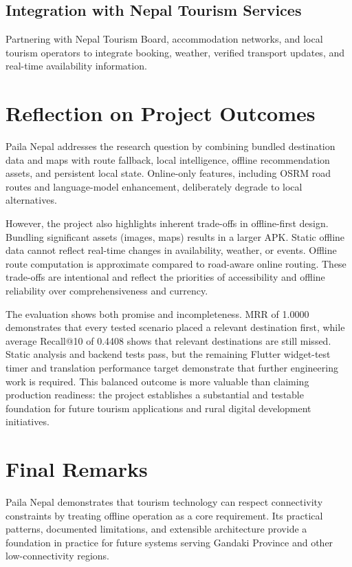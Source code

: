 \documentclass[12pt,a4paper,oneside]{report}
\begin{document}
\subsection{Integration with Nepal Tourism Services}

Partnering with Nepal Tourism Board, accommodation networks, and local tourism operators to integrate booking, weather, verified transport updates, and real-time availability information.

\section{Reflection on Project Outcomes}
\label{sec:reflection}

Paila Nepal addresses the research question by combining bundled destination data and maps with route fallback, local intelligence, offline recommendation assets, and persistent local state. Online-only features, including OSRM road routes and language-model enhancement, deliberately degrade to local alternatives.

However, the project also highlights inherent trade-offs in offline-first design. Bundling significant assets (images, maps) results in a larger APK. Static offline data cannot reflect real-time changes in availability, weather, or events. Offline route computation is approximate compared to road-aware online routing. These trade-offs are intentional and reflect the priorities of accessibility and offline reliability over comprehensiveness and currency.

The evaluation shows both promise and incompleteness. MRR of 1.0000 demonstrates that every tested scenario placed a relevant destination first, while average Recall@10 of 0.4408 shows that relevant destinations are still missed. Static analysis and backend tests pass, but the remaining Flutter widget-test timer and translation performance target demonstrate that further engineering work is required. This balanced outcome is more valuable than claiming production readiness: the project establishes a substantial and testable foundation for future tourism applications and rural digital development initiatives.

\section{Final Remarks}
\label{sec:final}

Paila Nepal demonstrates that tourism technology can respect connectivity constraints by treating offline operation as a core requirement. Its practical patterns, documented limitations, and extensible architecture provide a foundation in practice for future systems serving Gandaki Province and other low-connectivity regions.
\printbibliography[title=References]
\end{document}
